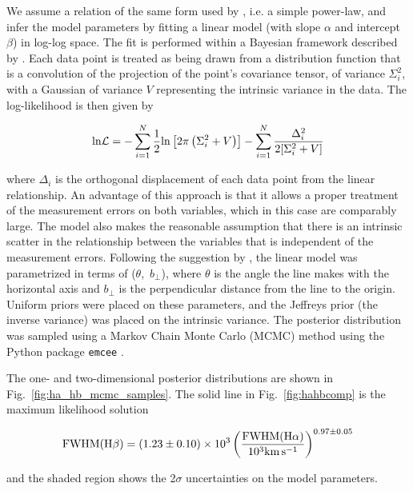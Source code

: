 We assume a relation of the same form used by \citet{greene05}, i.e. a simple power-law, and infer the model parameters by fitting a linear model (with slope $\alpha$ and intercept $\beta$) in log-log space.
The fit is performed within a Bayesian framework described by \citet{hogg10}. 
Each data point is treated as being drawn from a distribution function that is a convolution of the projection of the point's covariance tensor, of variance $\Sigma_i^2$, with a Gaussian of variance $V$ representing the intrinsic variance in the data.
The log-likelihood is then given by 

\begin{equation}
  {\rm ln} {\cal L} = - \sum_{i=1}^N \frac{1}{2} {\rm ln}\left[2\pi\left(\Sigma_i^2 + V\right)\right] - \sum_{i=1}^N \frac{\Delta_i^2}{2[\Sigma_i^2 + V]} 
\end{equation}

\noindent where $\Delta_i$ is the orthogonal displacement of each data point from the linear relationship. 
An advantage of this approach is that it allows a proper treatment of the measurement errors on both variables, which in this case are comparably large.
The model also makes the reasonable assumption that there is an intrinsic scatter in the relationship between the variables that is independent of the measurement errors.  
Following the suggestion by \citet{hogg10}, the linear model was parametrized in terms of ($\theta$,~$b_\bot$), where $\theta$ is the angle the line makes with the horizontal axis and $b_\bot$ is the perpendicular distance from the line to the origin.
Uniform priors were placed on these parameters, and the Jeffreys prior (the inverse variance) was placed on the intrinsic variance. 
The posterior distribution was sampled using a Markov Chain Monte Carlo (MCMC) method using the Python package {\tt emcee} \citep{foreman13}. 
 
The one- and two-dimensional posterior distributions are shown in Fig.~\ref{fig:ha_hb_mcmc_samples}. 
The solid line in Fig.~\ref{fig:hahbcomp} is the maximum likelihood solution

\begin{equation}
  \label{eq:ha2hb}
  \rm{FWHM}(\rm{H}\beta) = \left( 1.23 \pm 0.10 \right) \times 10^3 \left( \frac{\rm{FWHM}(\rm{H}\alpha)}{10^3 {\rm km\,s^{-1}}} \right)^{0.97 \pm 0.05}
\end{equation}

\noindent and the shaded region shows the 2$\sigma$ uncertainties on the model parameters.

